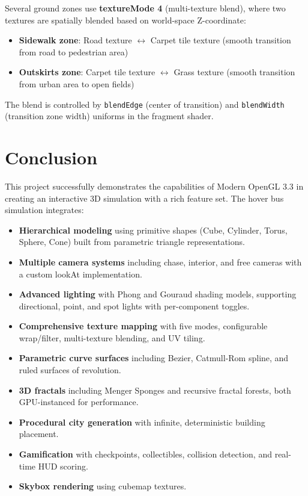 \documentclass[12pt,a4paper]{article}
\begin{document}
Several ground zones use \textbf{textureMode 4} (multi-texture blend), where two textures are spatially blended based on world-space Z-coordinate:
\begin{itemize}
    \item \textbf{Sidewalk zone}: Road texture $\leftrightarrow$ Carpet tile texture (smooth transition from road to pedestrian area)
    \item \textbf{Outskirts zone}: Carpet tile texture $\leftrightarrow$ Grass texture (smooth transition from urban area to open fields)
\end{itemize}

The blend is controlled by \texttt{blendEdge} (center of transition) and \texttt{blendWidth} (transition zone width) uniforms in the fragment shader.

\section{Conclusion}

This project successfully demonstrates the capabilities of Modern OpenGL 3.3 in creating an interactive 3D simulation with a rich feature set. The hover bus simulation integrates:

\begin{itemize}
    \item \textbf{Hierarchical modeling} using primitive shapes (Cube, Cylinder, Torus, Sphere, Cone) built from parametric triangle representations.
    \item \textbf{Multiple camera systems} including chase, interior, and free cameras with a custom lookAt implementation.
    \item \textbf{Advanced lighting} with Phong and Gouraud shading models, supporting directional, point, and spot lights with per-component toggles.
    \item \textbf{Comprehensive texture mapping} with five modes, configurable wrap/filter, multi-texture blending, and UV tiling.
    \item \textbf{Parametric curve surfaces} including Bezier, Catmull-Rom spline, and ruled surfaces of revolution.
    \item \textbf{3D fractals} including Menger Sponges and recursive fractal forests, both GPU-instanced for performance.
    \item \textbf{Procedural city generation} with infinite, deterministic building placement.
    \item \textbf{Gamification} with checkpoints, collectibles, collision detection, and real-time HUD scoring.
    \item \textbf{Skybox rendering} using cubemap textures.
\end{itemize}
\end{document}
